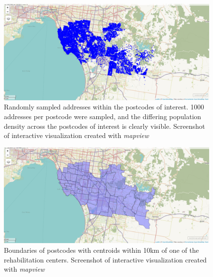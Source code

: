 \documentclass[utf8]{frontiersHLTH}
\begin{document}
\begin{figure}[h!]
\begin{center}
\includegraphics[width=15cm]{map2_mv.png}
\end{center}
\caption{Randomly sampled addresses within the postcodes of interest. 1000 addresses per postcode were sampled, and the differing population density across the postcodes of interest is clearly visible. Screenshot of interactive visualization created with {\em mapview}}\label{fig:RehabCenterRandomAddresses}
\end{figure}

\begin{figure}[h!]
\begin{center}
\includegraphics[width=15cm]{map3_mv.png}
\end{center}
\caption{Boundaries of postcodes with centroids within 10km of one of the
  rehabilitation centers. Screenshot of interactive visualization created with {\em mapview}}\label{fig:RehabCenterPostcodes}
\end{figure}
\end{document}
